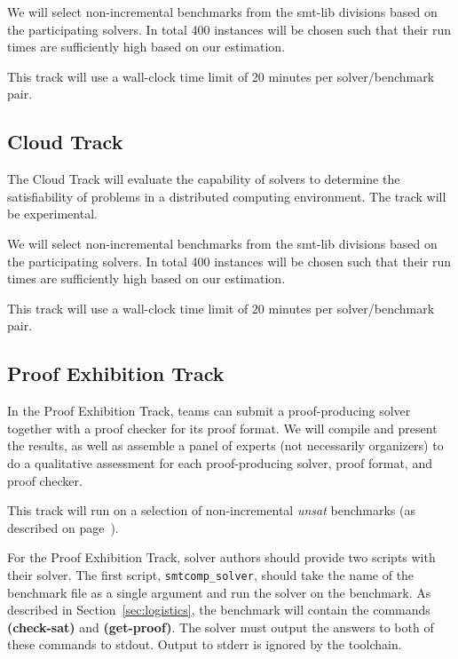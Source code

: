 \documentclass[12pt]{article}
\newcommand{\akey}[1]{\textbf{#1}\xspace}
\newcommand{\cloudtrack}{Cloud Track\xspace}
\newcommand{\prooftrack}{Proof Exhibition Track\xspace}
\begin{document}
We will select non-incremental benchmarks from the smt-lib divisions
based on the participating solvers.  In total 400 instances will be
chosen such that their run times are sufficiently high based on our
estimation.

This track will use a wall-clock time limit of 20 minutes per
solver/benchmark pair.

\subsection{\cloudtrack{}}
The \cloudtrack{} will evaluate the capability of solvers to determine
the satisfiability of problems in a distributed computing environment.
The track will be experimental.

We will select non-incremental benchmarks from the smt-lib divisions
based on the participating solvers.  In total 400 instances will be
chosen such that their run times are sufficiently high based on our
estimation.

This track will use a wall-clock time limit of 20 minutes per
solver/benchmark pair.

\subsection{\prooftrack}
\label{sec:exec:proof}

In the \prooftrack, teams can submit a proof-producing solver together with a
proof checker for its proof format.  We will compile and present the results, as
well as assemble a panel of experts (not necessarily organizers) to do a
qualitative assessment for each proof-producing solver, proof format, and proof
checker.

This track will run on a selection of non-incremental \emph{unsat} benchmarks
(as described on page~\pageref{benchmark-selection}).

For the \prooftrack, solver authors should provide two scripts
with their solver.  The first script,
\texttt{smtcomp\_solver}, should take the name of the benchmark file as
a single argument and run the solver on the benchmark.
%
As described in Section~\ref{sec:logistics}, the benchmark
will contain the commands \akey{(check-sat)} and \akey{(get-proof)}.
%
The solver must output the answers to both of these commands to stdout.
Output to stderr is ignored by the toolchain.
\end{document}
